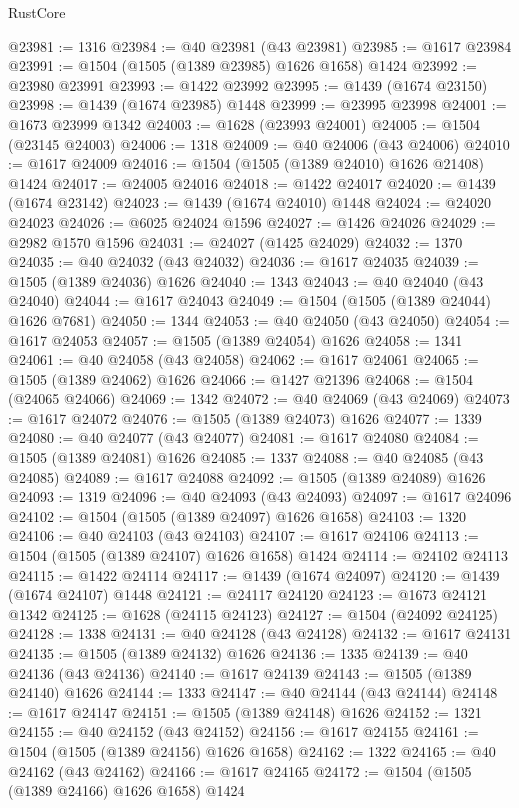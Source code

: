 \begin{lexlean}{RustCore}
\begin{coremodule}
@23981 := 1316
@23984 := @40 @23981 (@43 @23981)
@23985 := @1617 @23984
@23991 := @1504 (@1505 (@1389 @23985) @1626 @1658) @1424
@23992 := @23980 @23991
@23993 := @1422 @23992
@23995 := @1439 (@1674 @23150)
@23998 := @1439 (@1674 @23985) @1448
@23999 := @23995 @23998
@24001 := @1673 @23999 @1342
@24003 := @1628 (@23993 @24001)
@24005 := @1504 (@23145 @24003)
@24006 := 1318
@24009 := @40 @24006 (@43 @24006)
@24010 := @1617 @24009
@24016 := @1504 (@1505 (@1389 @24010) @1626 @21408) @1424
@24017 := @24005 @24016
@24018 := @1422 @24017
@24020 := @1439 (@1674 @23142)
@24023 := @1439 (@1674 @24010) @1448
@24024 := @24020 @24023
@24026 := @6025 @24024 @1596
@24027 := @1426 @24026
@24029 := @2982 @1570 @1596
@24031 := @24027 (@1425 @24029)
@24032 := 1370
@24035 := @40 @24032 (@43 @24032)
@24036 := @1617 @24035
@24039 := @1505 (@1389 @24036) @1626
@24040 := 1343
@24043 := @40 @24040 (@43 @24040)
@24044 := @1617 @24043
@24049 := @1504 (@1505 (@1389 @24044) @1626 @7681)
@24050 := 1344
@24053 := @40 @24050 (@43 @24050)
@24054 := @1617 @24053
@24057 := @1505 (@1389 @24054) @1626
@24058 := 1341
@24061 := @40 @24058 (@43 @24058)
@24062 := @1617 @24061
@24065 := @1505 (@1389 @24062) @1626
@24066 := @1427 @21396
@24068 := @1504 (@24065 @24066)
@24069 := 1342
@24072 := @40 @24069 (@43 @24069)
@24073 := @1617 @24072
@24076 := @1505 (@1389 @24073) @1626
@24077 := 1339
@24080 := @40 @24077 (@43 @24077)
@24081 := @1617 @24080
@24084 := @1505 (@1389 @24081) @1626
@24085 := 1337
@24088 := @40 @24085 (@43 @24085)
@24089 := @1617 @24088
@24092 := @1505 (@1389 @24089) @1626
@24093 := 1319
@24096 := @40 @24093 (@43 @24093)
@24097 := @1617 @24096
@24102 := @1504 (@1505 (@1389 @24097) @1626 @1658)
@24103 := 1320
@24106 := @40 @24103 (@43 @24103)
@24107 := @1617 @24106
@24113 := @1504 (@1505 (@1389 @24107) @1626 @1658) @1424
@24114 := @24102 @24113
@24115 := @1422 @24114
@24117 := @1439 (@1674 @24097)
@24120 := @1439 (@1674 @24107) @1448
@24121 := @24117 @24120
@24123 := @1673 @24121 @1342
@24125 := @1628 (@24115 @24123)
@24127 := @1504 (@24092 @24125)
@24128 := 1338
@24131 := @40 @24128 (@43 @24128)
@24132 := @1617 @24131
@24135 := @1505 (@1389 @24132) @1626
@24136 := 1335
@24139 := @40 @24136 (@43 @24136)
@24140 := @1617 @24139
@24143 := @1505 (@1389 @24140) @1626
@24144 := 1333
@24147 := @40 @24144 (@43 @24144)
@24148 := @1617 @24147
@24151 := @1505 (@1389 @24148) @1626
@24152 := 1321
@24155 := @40 @24152 (@43 @24152)
@24156 := @1617 @24155
@24161 := @1504 (@1505 (@1389 @24156) @1626 @1658)
@24162 := 1322
@24165 := @40 @24162 (@43 @24162)
@24166 := @1617 @24165
@24172 := @1504 (@1505 (@1389 @24166) @1626 @1658) @1424

\end{coremodule}
\end{lexlean}
